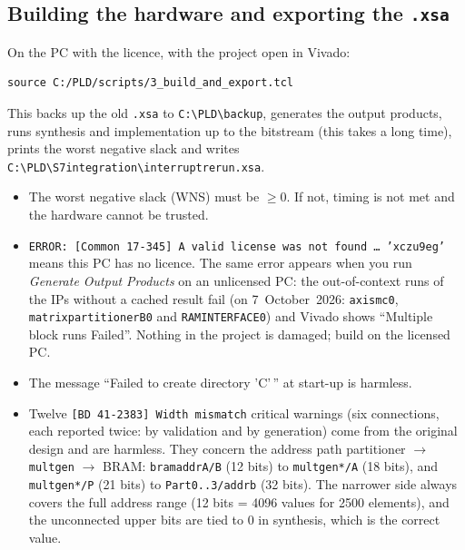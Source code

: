 \documentclass[11pt,a4paper]{article}
\newcommand{\code}[1]{\texttt{#1}}
\newcommand{\bs}{\textbackslash\allowbreak{}}
\renewcommand{\_}{\oldunderscore\allowbreak{}}
\newcommand{\pld}[1]{\code{C:\bs PLD\bs #1}}
\begin{document}
\subsection{Building the hardware and exporting the \code{.xsa}}\label{sec:build}
On the PC with the licence, with the project open in Vivado:
\begin{lstlisting}
source C:/PLD/scripts/3_build_and_export.tcl
\end{lstlisting}
This backs up the old \code{.xsa} to \pld{backup}, generates the output products, runs synthesis and implementation up to the bitstream (this takes a long time), prints the worst negative slack and writes \pld{S7\_integration\bs interrupt\_rerun.xsa}.
\begin{itemize}[noitemsep]
  \item The worst negative slack (WNS) must be $\geq 0$. If not, timing is not met and the hardware cannot be trusted.
  \item \code{ERROR: [Common 17-345] A valid license was not found \ldots\ 'xczu9eg'} means this PC has no licence. The same error appears when you run \emph{Generate Output Products} on an unlicensed PC: the out-of-context runs of the IPs without a cached result fail (on 7~October~2026: \code{axi\_smc\_0}, \code{matrix\_partitioner\_B\_0} and \code{RAM\_INTERFACE\_0}) and Vivado shows ``Multiple block runs Failed''. Nothing in the project is damaged; build on the licensed PC.
  \item The message ``Failed to create directory 'C'\,'' at start-up is harmless.
  \item Twelve \code{[BD 41-2383] Width mismatch} critical warnings (six connections, each reported twice: by validation and by generation) come from the original design and are harmless. They concern the address path partitioner $\rightarrow$ \code{mult\_gen} $\rightarrow$ BRAM: \code{bram\_addr\_A/B} (12 bits) to \code{mult\_gen\_*/A} (18 bits), and \code{mult\_gen\_*/P} (21 bits) to \code{Part0..3/addrb} (32 bits). The narrower side always covers the full address range (12 bits = 4096 values for 2500 elements), and the unconnected upper bits are tied to 0 in synthesis, which is the correct value.
\end{itemize}
\end{document}

